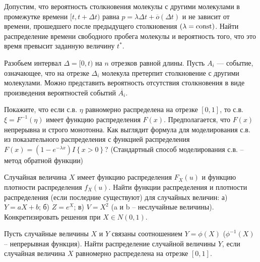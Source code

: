 

\begin{problem}
Допустим, что вероятность столкновения молекулы с другими молекулами в промежутке времени $[t,t + \Delta t)$ 
равна $p = \lambda\Delta t+{\overline o}(\Delta t)$ и не зависит от времени, прошедшего после предыдущего столкновения $(\lambda = \mathop{\mathrm{const}}\nolimits)$. 
Найти распределение времени свободного пробега молекулы и вероятность того, что это время превысит заданную величину $t^*$. 
\end{problem}

\begin{ordre}
Разобьем интервал $\Delta=[0,t)$ на $n$ отрезков равной длины.
Пусть $A_i$ --- событие, означающее, что на отрезке $\Delta_i$  молекула претерпит столкновение с другими молекулами. Можно представить вероятность отсутствия столкновения в виде произведения вероятностей событий $\overline{A_i}$.
\end{ordre}

\begin{problem}
Покажите, что если с.в. $\eta $ равномерно распределена на отрезке $\left[0,1\right]$, то с.в. $\xi =F^{-1} \left(\eta \right)$ имеет функцию распределения $F\left(x\right)$. Предполагается, что $F\left(x\right)$ непрерывна и строго монотонна. Как выглядит формула для моделирования с.в. из показательного распределения с функцией распределения $F\left(x\right)=\left(1-e^{-\lambda x} \right)I\left\{x>0\right\}$? (Стандартный способ моделирования с.в. -- метод обратной функции)
\end{problem}

\begin{problem}
Случайная величина $X$ имеет функцию распределения $F_X(u)$ и функцию плотности распределения $f_X(u)$. Найти функции распределения и плотности распределения (если последние существуют) для случайных величин: а) $Y = aX+b$; б) $Z =e^X$; в) $V = X^2$ (a и b – неслучайные величины). Конкретизировать решения при $X \in N(0,1)$.
\end{problem}

\begin{problem}
Пусть случайные величины $X$ и $Y$ связаны соотношением $Y = \phi(X)$ ($\phi^{-1}(X)$ – непрерывная функция). Найти распределение случайной величины $Y$, если случайная величина $X$ равномерно распределена на отрезке $[0,1]$.
\end{problem}

